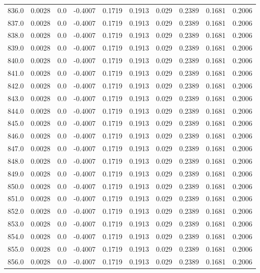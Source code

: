 \begin{longtable}{lrrrrrrrrr}
836.0 & 0.0028 & 0.0 & -0.4007 & 0.1719 & 0.1913 & 0.029 & 0.2389 & 0.1681 & 0.2006 \\
837.0 & 0.0028 & 0.0 & -0.4007 & 0.1719 & 0.1913 & 0.029 & 0.2389 & 0.1681 & 0.2006 \\
838.0 & 0.0028 & 0.0 & -0.4007 & 0.1719 & 0.1913 & 0.029 & 0.2389 & 0.1681 & 0.2006 \\
839.0 & 0.0028 & 0.0 & -0.4007 & 0.1719 & 0.1913 & 0.029 & 0.2389 & 0.1681 & 0.2006 \\
840.0 & 0.0028 & 0.0 & -0.4007 & 0.1719 & 0.1913 & 0.029 & 0.2389 & 0.1681 & 0.2006 \\
841.0 & 0.0028 & 0.0 & -0.4007 & 0.1719 & 0.1913 & 0.029 & 0.2389 & 0.1681 & 0.2006 \\
842.0 & 0.0028 & 0.0 & -0.4007 & 0.1719 & 0.1913 & 0.029 & 0.2389 & 0.1681 & 0.2006 \\
843.0 & 0.0028 & 0.0 & -0.4007 & 0.1719 & 0.1913 & 0.029 & 0.2389 & 0.1681 & 0.2006 \\
844.0 & 0.0028 & 0.0 & -0.4007 & 0.1719 & 0.1913 & 0.029 & 0.2389 & 0.1681 & 0.2006 \\
845.0 & 0.0028 & 0.0 & -0.4007 & 0.1719 & 0.1913 & 0.029 & 0.2389 & 0.1681 & 0.2006 \\
846.0 & 0.0028 & 0.0 & -0.4007 & 0.1719 & 0.1913 & 0.029 & 0.2389 & 0.1681 & 0.2006 \\
847.0 & 0.0028 & 0.0 & -0.4007 & 0.1719 & 0.1913 & 0.029 & 0.2389 & 0.1681 & 0.2006 \\
848.0 & 0.0028 & 0.0 & -0.4007 & 0.1719 & 0.1913 & 0.029 & 0.2389 & 0.1681 & 0.2006 \\
849.0 & 0.0028 & 0.0 & -0.4007 & 0.1719 & 0.1913 & 0.029 & 0.2389 & 0.1681 & 0.2006 \\
850.0 & 0.0028 & 0.0 & -0.4007 & 0.1719 & 0.1913 & 0.029 & 0.2389 & 0.1681 & 0.2006 \\
851.0 & 0.0028 & 0.0 & -0.4007 & 0.1719 & 0.1913 & 0.029 & 0.2389 & 0.1681 & 0.2006 \\
852.0 & 0.0028 & 0.0 & -0.4007 & 0.1719 & 0.1913 & 0.029 & 0.2389 & 0.1681 & 0.2006 \\
853.0 & 0.0028 & 0.0 & -0.4007 & 0.1719 & 0.1913 & 0.029 & 0.2389 & 0.1681 & 0.2006 \\
854.0 & 0.0028 & 0.0 & -0.4007 & 0.1719 & 0.1913 & 0.029 & 0.2389 & 0.1681 & 0.2006 \\
855.0 & 0.0028 & 0.0 & -0.4007 & 0.1719 & 0.1913 & 0.029 & 0.2389 & 0.1681 & 0.2006 \\
856.0 & 0.0028 & 0.0 & -0.4007 & 0.1719 & 0.1913 & 0.029 & 0.2389 & 0.1681 & 0.2006 \\

\end{longtable}
